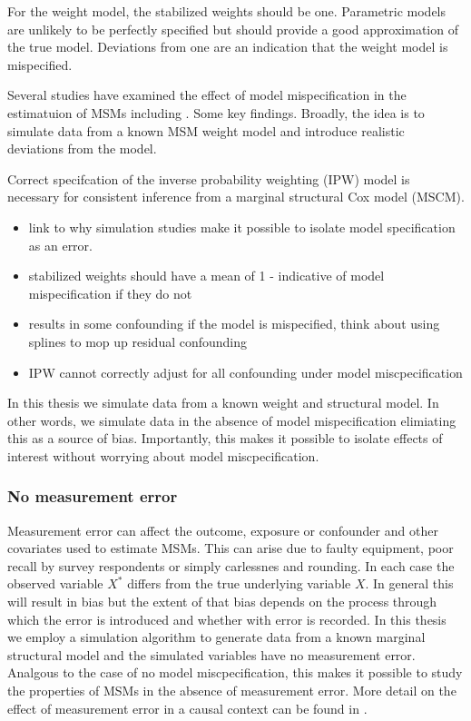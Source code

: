 \documentclass[11pt]{article}
\providecommand{\tightlist}{%
      \setlength{\itemsep}{0pt}\setlength{\parskip}{0pt}}
\begin{document}
For the weight model, the stabilized weights should be one. Parametric
models are unlikely to be perfectly specified but should provide a good
approximation of the true model. Deviations from one are an indication
that the weight model is mispecified.

Several studies have examined the effect of model mispecification in the
estimatuion of MSMs including \citet{Cole2009}. Some key findings.
Broadly, the idea is to simulate data from a known MSM weight model and
introduce realistic deviations from the model.

Correct specifcation of the inverse probability weighting (IPW) model is
necessary for consistent inference from a marginal structural Cox model
(MSCM).

\begin{itemize}
\tightlist
\item
  link to why simulation studies make it possible to isolate model
  specification as an error.
\item
  stabilized weights should have a mean of 1 - indicative of model
  mispecification if they do not
\item
  results in some confounding if the model is mispecified, think about
  using splines to mop up residual confounding
\item
  IPW cannot correctly adjust for all confounding under model
  miscpecification
\end{itemize}

In this thesis we simulate data from a known weight and structural
model. In other words, we simulate data in the absence of model
mispecification elimiating this as a source of bias. Importantly, this
makes it possible to isolate effects of interest without worrying about
model miscpecification.

\subsubsection{No measurement error}\label{no-measurement-error}

Measurement error can affect the outcome, exposure or confounder and
other covariates used to estimate MSMs. This can arise due to faulty
equipment, poor recall by survey respondents or simply carlessnes and
rounding. In each case the observed variable \(X^*\) differs from the
true underlying variable \(X\). In general this will result in bias but
the extent of that bias depends on the process through which the error
is introduced and whether with error is recorded. In this thesis we
employ a simulation algorithm to generate data from a known marginal
structural model and the simulated variables have no measurement error.
Analgous to the case of no model miscpecification, this makes it
possible to study the properties of MSMs in the absence of measurement
error. More detail on the effect of measurement error in a causal
context can be found in \citet{Hernan2009}.
\end{document}
